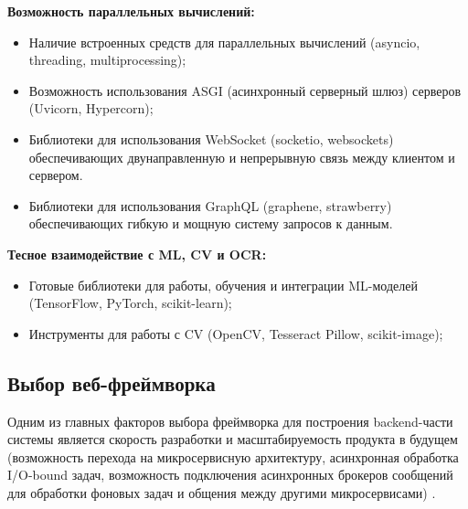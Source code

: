 \begin{compactenum}
	\item \textbf{Возможность параллельных вычислений:}
		\begin{itemize}
			\item Наличие встроенных средств для параллельных вычислений (asyncio, threading, multiprocessing);
			\item Возможность использования ASGI (асинхронный серверный шлюз) серверов (Uvicorn, Hypercorn);
			\item Библиотеки для использования WebSocket (socketio, websockets) обеспечивающих двунаправленную и непрерывную связь между клиентом и сервером.
			\item Библиотеки для использования GraphQL (graphene, strawberry) обеспечивающих гибкую и мощную систему запросов к данным.
		\end{itemize}

	\item \textbf{Тесное взаимодействие с ML, CV и OCR:}
	    \begin{itemize}
			\item Готовые библиотеки для работы, обучения и интеграции ML-моделей (TensorFlow, PyTorch, scikit-learn);
			\item Инструменты для работы с CV (OpenCV, Tesseract Pillow, scikit-image);
		\end{itemize}
\end{compactenum}
\nocite{crossreff-api}
\subsection{Выбор веб-фреймворка}

Одним из главных факторов выбора фреймворка для построения backend-части системы
является скорость разработки и масштабируемость продукта в будущем (возможность перехода
на микросервисную архитектуру, асинхронная обработка I/O-bound задач, возможность
подключения асинхронных брокеров сообщений для обработки фоновых задач и общения
между другими микросервисами) \cite{fastapi-bill, modern-python,fastapi-best-practices}.

